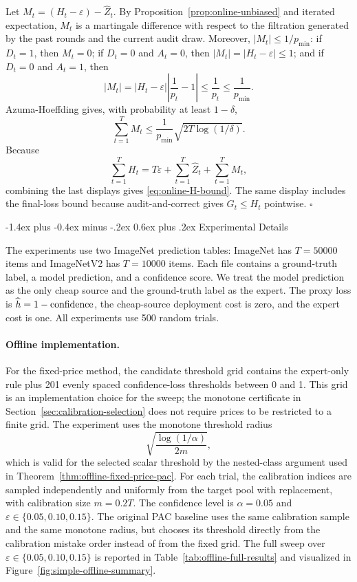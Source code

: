 \documentclass[11pt]{article}
\makeatletter
\renewcommand\section{\@startsection{section}{1}{\z@}%
  {-1.4ex plus -0.4ex minus -.2ex}%
  {0.6ex plus .2ex}%
  {\normalfont\Large\bfseries}}
\newcommand{\hath}{\widehat h}
\newcommand{\eps}{\varepsilon}
\makeatother
\begin{document}
Let $M_t=(H_t-\eps)-\widehat Z_t$.
By Proposition~\ref{prop:online-unbiased} and iterated expectation, $M_t$ is a
martingale difference with respect to the filtration generated by the past
rounds and the current audit draw. Moreover, $|M_t|\le1/p_{\min}$: if
$D_t=1$, then $M_t=0$; if $D_t=0$ and $A_t=0$, then
$|M_t|=|H_t-\eps|\le1$; and if $D_t=0$ and $A_t=1$, then
\[
    |M_t|
    =
    |H_t-\eps|\left|\frac{1}{p_t}-1\right|
    \le
    \frac{1}{p_t}
    \le
    \frac{1}{p_{\min}}.
\]
Azuma-Hoeffding gives, with probability at least $1-\delta$,
\[
    \sum_{t=1}^T M_t
    \le
    \frac{1}{p_{\min}}\sqrt{2T\log(1/\delta)}.
\]
Because
\[
    \sum_{t=1}^T H_t
    =
    T\eps+\sum_{t=1}^T\widehat Z_t+\sum_{t=1}^T M_t,
\]
combining the last displays gives \eqref{eq:online-H-bound}.
The same display includes the final-loss bound because audit-and-correct gives
$G_t\le H_t$ pointwise. \hfill$\square$

\section{Experimental Details}
\label{app:experiments}

The experiments use two ImageNet prediction tables: ImageNet has $T=50000$
items and ImageNetV2 has $T=10000$ items.
Each file contains a ground-truth label, a model prediction, and a confidence
score.
We treat the model prediction as the only cheap source and the ground-truth
label as the expert.
The proxy loss is $\hath=1-\textnormal{confidence}$, the cheap-source
deployment cost is zero, and the expert cost is one.
All experiments use 500 random trials.

\paragraph{Offline implementation.}
For the fixed-price method, the candidate threshold grid contains the
expert-only rule plus 201 evenly spaced confidence-loss thresholds between
0 and 1.
This grid is an implementation choice for the sweep; the monotone certificate
in Section~\ref{sec:calibration-selection} does not require prices to be
restricted to a finite grid. The experiment uses the monotone threshold radius
\[
    \sqrt{\frac{\log(1/\alpha)}{2m}},
\]
which is valid for the selected scalar threshold by the nested-class argument
used in Theorem~\ref{thm:offline-fixed-price-pac}.
For each trial, the calibration indices are sampled independently and
uniformly from the target pool with replacement, with calibration size
$m=0.2T$.
The confidence level is $\alpha=0.05$ and
$\eps\in\{0.05,0.10,0.15\}$.
The original PAC baseline uses the same calibration sample and the same
monotone radius, but chooses its threshold directly from the calibration
mistake order instead of from the fixed grid. The full sweep over
$\eps\in\{0.05,0.10,0.15\}$ is reported in
Table~\ref{tab:offline-full-results} and visualized in
Figure~\ref{fig:simple-offline-summary}.
\end{document}
